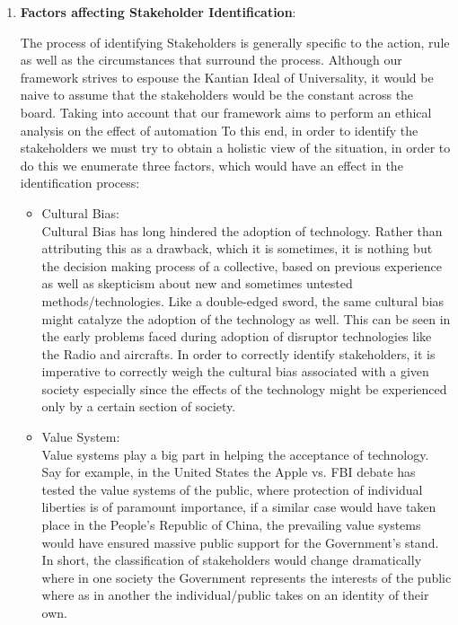 \begin{enumerate}[a]
  \item \textbf{Factors affecting Stakeholder Identification}:

    The process of identifying Stakeholders is generally specific to the action, rule as well as the circumstances that surround the process. Although our framework strives to espouse the Kantian Ideal of Universality, it would be naive to assume that the stakeholders would be the constant across the board. Taking into account that our framework aims to perform an ethical analysis on the effect of automation
    To this end, in order to identify the stakeholders we must try to obtain a holistic view of the situation, in order to do this we enumerate three factors, which would have an effect in the identification process:\\
    \begin{itemize}
      \item Cultural Bias:\\
        Cultural Bias has long hindered the adoption of technology. Rather than attributing this as a drawback, which it is sometimes, it is nothing but the decision making process of a collective, based on previous experience as well as skepticism about new and sometimes untested methods/technologies. Like a double-edged sword, the same cultural bias might catalyze the adoption of the technology as well. This can be seen in the early problems faced during adoption of disruptor technologies like the Radio and aircrafts. In order to correctly identify stakeholders, it is imperative to correctly weigh the cultural bias associated with a given society especially since the effects of the technology might be experienced only by a certain section of society.
      \item  Value System:\\
        Value systems play a big part in helping the acceptance of technology. Say for example, in the United States the Apple vs. FBI debate has tested the value systems of the public, where protection of individual liberties is of paramount importance, if a similar case would have taken place in the People's Republic of China, the prevailing value systems would have ensured massive public support for the Government's stand.\\
        In short, the classification of stakeholders would change dramatically where in one society the Government represents the interests of the public where as in another the individual/public takes on an identity of their own.

\end{itemize}
\end{enumerate}

